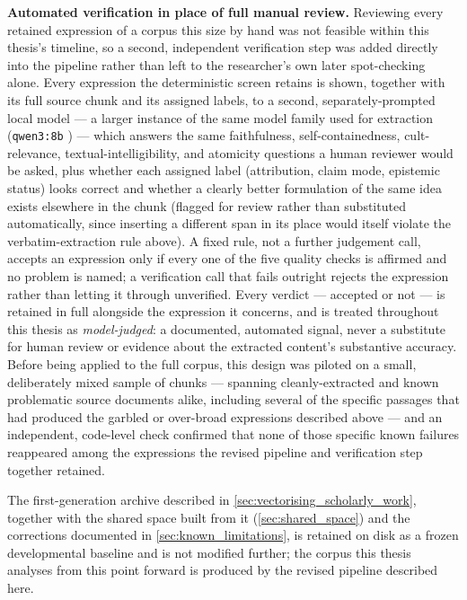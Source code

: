 \textbf{Automated verification in place of full manual review.} Reviewing every retained expression of a corpus this size by hand was not feasible within this thesis's timeline, so a second, independent verification step was added directly into the pipeline rather than left to the researcher's own later spot-checking alone. Every expression the deterministic screen retains is shown, together with its full source chunk and its assigned labels, to a second, separately-prompted local model — a larger instance of the same model family used for extraction (\texttt{qwen3:8b} \autocite{yangQwen3TechnicalReport2025}) — which answers the same faithfulness, self-containedness, cult-relevance, textual-intelligibility, and atomicity questions a human reviewer would be asked, plus whether each assigned label (attribution, claim mode, epistemic status) looks correct and whether a clearly better formulation of the same idea exists elsewhere in the chunk (flagged for review rather than substituted automatically, since inserting a different span in its place would itself violate the verbatim-extraction rule above). A fixed rule, not a further judgement call, accepts an expression only if every one of the five quality checks is affirmed and no problem is named; a verification call that fails outright rejects the expression rather than letting it through unverified. Every verdict — accepted or not — is retained in full alongside the expression it concerns, and is treated throughout this thesis as \textit{model-judged}: a documented, automated signal, never a substitute for human review or evidence about the extracted content's substantive accuracy. Before being applied to the full corpus, this design was piloted on a small, deliberately mixed sample of chunks — spanning cleanly-extracted and known problematic source documents alike, including several of the specific passages that had produced the garbled or over-broad expressions described above — and an independent, code-level check confirmed that none of those specific known failures reappeared among the expressions the revised pipeline and verification step together retained.

The first-generation archive described in \ref{sec:vectorising_scholarly_work}, together with the shared space built from it (\ref{sec:shared_space}) and the corrections documented in \ref{sec:known_limitations}, is retained on disk as a frozen developmental baseline and is not modified further; the corpus this thesis analyses from this point forward is produced by the revised pipeline described here.

